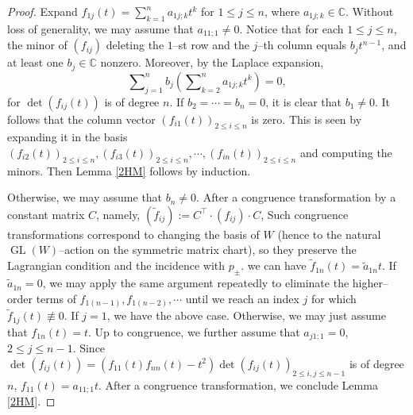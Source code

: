 \documentclass[10pt]{amsart}
\theoremstyle{definition}
\newcommand{\GL}{\operatorname{GL}}
\theoremstyle{plain} %
\begin{document}
\begin{proof}
Expand $f_{1j}(t)=\sum_{k=1}^na_{1j;k}t^k$ for $1\leq j\leq n$, where $a_{1j;k}\in\mathbb C$.
Without loss of generality, we may assume that $a_{11;1}\neq 0$. Notice that for each $1\leq j\leq n$, the minor of $(f_{ij})$ deleting the $1$--st row and the $j$--th column equals $b_{j} t^{n-1}$, and at least one $b_j\in\mathbb C$  nonzero. Moreover,  by the Laplace expansion,
$$\sum\nolimits_{j=1}^nb_j\left(\sum\nolimits_{k=2}^na_{1j;k}t^k\right)=0,$$
for $\det(f_{ij}(t))$ is of degree $n$.
If $b_2=\cdots=b_n=0$, it is clear that $b_1\neq 0$. It follows that the column vector $(f_{i1}(t))_{2\leq i\leq n}$ is zero. This is seen by expanding it in the basis $(f_{i2}(t))_{2\leq i\leq n}, (f_{i3}(t))_{2\leq i\leq n},\cdots, (f_{in}(t))_{2\leq i\leq n}$ and computing the minors. Then Lemma \ref{2HM} follows by induction.





Otherwise, we may assume that $b_n\neq0$. After a congruence transformation by a constant matrix $C$, namely, $(\widetilde f_{ij}):=C^{\!\top}\cdot(f_{ij})\cdot C$,
Such congruence transformations correspond to changing the basis of $W$ (hence to the natural $\GL(W)$--action on the symmetric matrix chart), so they preserve the Lagrangian condition and the incidence with $p_\pm$.
 we can have $\widetilde f_{1n}(t)=\widetilde a_{1n}t$. If $\widetilde a_{1n}=0$, we may apply the same argument repeatedly to eliminate the higher--order terms of $f_{1(n-1)}, f_{1(n-2)},\cdots$  until we reach an index $j$ for which $\widetilde f_{1j}(t)\not\equiv  0$. 
If $j=1$, we have the above case. Otherwise, we may just assume that $f_{1n}(t)=t$. Up to congruence, we further assume that $a_{j1;1}=0$, $2\leq j\leq n-1$. Since $\det(f_{ij}(t))=(f_{11}(t)f_{nn}(t)-t^2)\det(f_{ij}(t))_{2\leq i,j\leq n-1}$ is of degree $n$, $f_{11}(t)=a_{11;1}t$. After a congruence transformation, we conclude Lemma \ref{2HM}. 
\end{proof}
\end{document}
